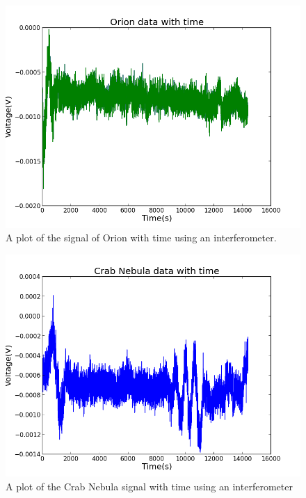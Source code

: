 \documentclass[12pt]{article}
\begin{document}
\begin {figure}[h!]
\centering
\includegraphics[scale = 0.5]
{orionwithtime.png}
\caption{\label{rvd} A plot of the signal of Orion with time using an interferometer.}
\end {figure}

\begin {figure}[h!]
\centering
\includegraphics[scale = 0.5]
{crabwithtime.png}
\caption{\label{rvd} A plot of the Crab Nebula signal with time using an interferometer}
\end {figure}
\end{document}
